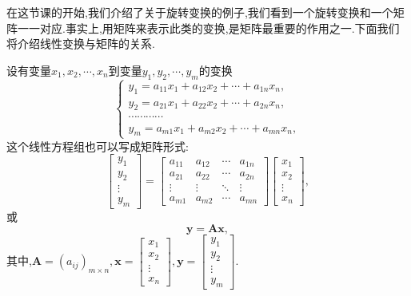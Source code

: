 在这节课的开始,我们介绍了关于旋转变换的例子,我们看到一个旋转变换和一个矩阵一一对应.事实上,用矩阵来表示此类的变换,是矩阵最重要的作用之一.下面我们将介绍线性变换与矩阵的关系.

设有变量$x_1,x_2,\cdots,x_n$到变量$y_1,y_2,\cdots,y_m$的变换
\begin{equation}
	\label{le}
	\left\{\begin{matrix}
		y_1=a_{11}x_1+a_{12}x_2+\cdots+a_{1n}x_n, \\
		y_2=a_{21}x_1+a_{22}x_2+\cdots+a_{2n}x_n, \\
		\cdots\cdots\cdots\cdots                  \\
		y_m=a_{m1}x_1+a_{m2}x_2+\cdots+a_{mn}x_n,
	\end{matrix}\right.
\end{equation}
这个线性方程组也可以写成矩阵形式:
\[
	\begin{bmatrix}
		y_{1}  \\
		y_{2}  \\
		\vdots \\
		y_{m}
	\end{bmatrix}
	=\begin{bmatrix}
		a_{11} & a_{12} & \cdots & a_{1n} \\
		a_{21} & a_{22} & \cdots & a_{2n} \\
		\vdots & \vdots & \ddots & \vdots \\
		a_{m1} & a_{m2} & \cdots & a_{mn}
	\end{bmatrix}
	\begin{bmatrix}
		x_{1}  \\
		x_{2}  \\
		\vdots \\
		x_{n}
	\end{bmatrix},
\]
或
\begin{equation}
	\label{le2}
	\mathbf{y=Ax},
\end{equation}
其中,$\mathbf{A}=\left(a_{ij}\right)_{m\times n},
	\mathbf{x}=	\begin{bmatrix}
		x_{1}  \\
		x_{2}  \\
		\vdots \\
		x_{n}
	\end{bmatrix},
	\mathbf{y}=	\begin{bmatrix}
		y_{1}  \\
		y_{2}  \\
		\vdots \\
		y_{m}
	\end{bmatrix}.$

